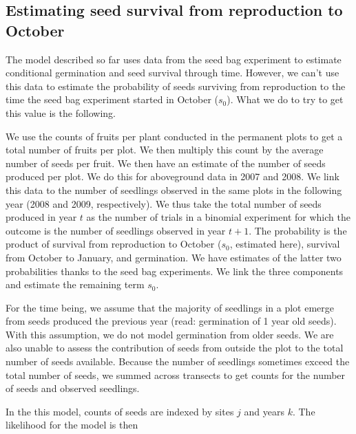 \documentclass[12pt, oneside, titlepage]{article}   	%
\begin{document}
\subsection{Estimating seed survival from reproduction to October}

The model described so far uses data from the seed bag experiment to estimate conditional germination and seed survival through time. However, we can't use this data to estimate the probability of seeds surviving from reproduction to the time the seed bag experiment started in October ($s_0$). What we do to try to get this value is the following.

We use the counts of fruits per plant conducted in the permanent plots to get a total number of fruits per plot. We then multiply this count by the average number of seeds per fruit. We then have an estimate of the number of seeds produced per plot. We do this for aboveground data in 2007 and 2008. We link this data to the number of seedlings observed in the same plots in the following year (2008 and 2009, respectively). We thus take the total number of seeds produced in year $t$ as the number of trials in a binomial experiment for which the outcome is the number of seedlings observed in year $t+1$. The probability is the product of survival from reproduction to October ($s_0$, estimated here), survival from October to January, and germination. We have estimates of the latter two probabilities thanks to the seed bag experiments. We link the three components and estimate the remaining term $s_0$.

For the time being, we assume that the majority of seedlings in a plot emerge from seeds produced the previous year (read: germination of 1 year old seeds). With this assumption, we do not model germination from older seeds. We are also unable to assess the contribution of seeds from outside the plot to the total number of seeds available. Because the number of seedlings sometimes exceed the total number of seeds, we summed across transects to get counts for the number of seeds and observed seedlings.

In the this model, counts of seeds are indexed by sites $j$ and years $k$. The likelihood for the model is then
\end{document}

